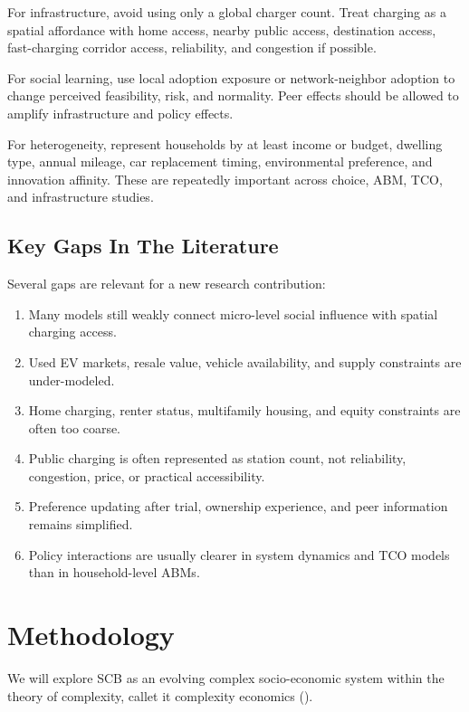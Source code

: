 \documentclass[11pt]{article} %
\begin{document}
For infrastructure, avoid using only a global charger count. Treat charging as a
spatial affordance with home access, nearby public access, destination access,
fast-charging corridor access, reliability, and congestion if possible.

For social learning, use local adoption exposure or network-neighbor adoption to
change perceived feasibility, risk, and normality. Peer effects should be
allowed to amplify infrastructure and policy effects.

For heterogeneity, represent households by at least income or budget, dwelling
type, annual mileage, car replacement timing, environmental preference, and
innovation affinity. These are repeatedly important across choice, ABM, TCO, and
infrastructure studies.

\subsection{Key Gaps In The Literature}

Several gaps are relevant for a new research contribution:

\begin{enumerate}
    \item Many models still weakly connect micro-level social influence with
    spatial charging access.
    \item Used EV markets, resale value, vehicle availability, and supply
    constraints are under-modeled.
    \item Home charging, renter status, multifamily housing, and equity
    constraints are often too coarse.
    \item Public charging is often represented as station count, not
    reliability, congestion, price, or practical accessibility.
    \item Preference updating after trial, ownership experience, and peer
    information remains simplified.
    \item Policy interactions are usually clearer in system dynamics and TCO
    models than in household-level ABMs.
\end{enumerate}

\newpage

\section{Methodology}

We will explore SCB as an evolving complex socio-economic system within the theory of complexity,
callet it complexity economics ().\\
\end{document}

